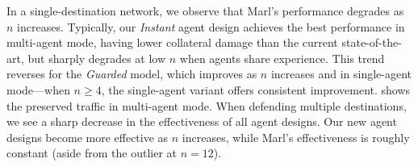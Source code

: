 \documentclass[10pt, times, comsoc]{IEEEtran}
\begin{document}
%	
%
%	
%
%	

In a single-destination network, we observe that Marl's performance degrades as $n$ increases.
Typically, our \emph{Instant} agent design achieves the best performance in multi-agent mode, having lower collateral damage than the current state-of-the-art, but sharply degrades at low $n$ when agents share experience.
This trend reverses for the \emph{Guarded} model, which improves as $n$ increases and in single-agent mode---when $n\ge4$, the single-agent variant offers consistent improvement.
 shows the preserved traffic in multi-agent mode.
When defending multiple destinations, we see a sharp decrease in the effectiveness of all agent designs.
Our new agent designs become more effective as $n$ increases, while Marl's effectiveness is roughly constant (aside from the outlier at $n=12$).
 \cbend
\end{document}

